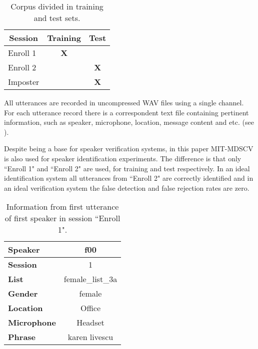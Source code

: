 \begin{table}[h]
    \centering
    \begin{tabular}{|l|c|c|}
    \hline
    \multicolumn{1}{|c|}{{\bf Session}} & {\bf Training} & {\bf Test} \\ \hline
    Enroll 1                            & {\bf X}        & {\bf }     \\ \hline
    Enroll 2                            & {\bf }         & {\bf X}    \\ \hline
    Imposter                            & {\bf }         & {\bf X}    \\ \hline
    \end{tabular}
    \caption{Corpus divided in training and test sets.}
    \label{tab:corpus-division}
\end{table}

All utterances are recorded in uncompressed WAV files using a single channel. For each utterance record there is a correspondent text file containing pertinent information, such as speaker, microphone, location, message content and etc. (see ).

Despite being a base for speaker verification systems, in this paper MIT-MDSCV is also used for speaker identification experiments. The difference is that only ``Enroll 1" and ``Enroll 2" are used, for training and test respectively. In an ideal identification system all utterances from ``Enroll 2" are correctly identified and in an ideal verification system the false detection and false rejection rates are zero.

\begin{table}[h]
    \centering
    \begin{tabular}{|l|c|}
    \hline
    {\bf Speaker}    & f00              \\ \hline
    {\bf Session}    & 1                \\ \hline
    {\bf List}       & female\_list\_3a \\ \hline
    {\bf Gender}     & female           \\ \hline
    {\bf Location}   & Office           \\ \hline
    {\bf Microphone} & Headset          \\ \hline
    {\bf Phrase}     & karen livescu    \\ \hline
    \end{tabular}
    \caption{Information from first utterance of first speaker in session ``Enroll 1".}
    \label{tab:utterance-info}
\end{table}

